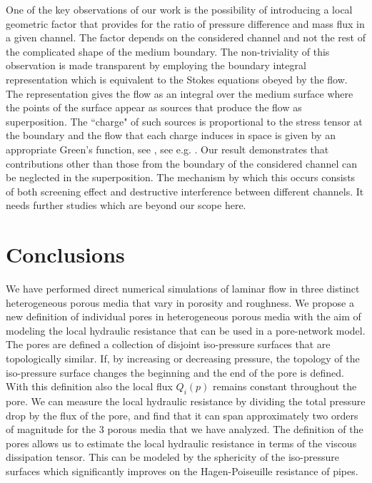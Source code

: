 \documentclass[draft]{agujournal2019}
\begin{document}
One of the key observations of our work is the possibility of introducing a local geometric factor that provides for the ratio of pressure difference and mass flux in a given channel. The factor depends on the considered channel and not the rest of the complicated shape of the medium boundary. The non-triviality of this observation is made transparent by employing the boundary integral representation which is equivalent to the Stokes equations obeyed by the flow. The representation gives the flow as an integral over the medium surface where the points of the surface appear as sources that produce the flow as superposition. The ``charge" of such sources is proportional to the stress tensor at the boundary and the flow that each charge induces in space is given by an appropriate Green's function, see , see e.g. \cite{pozrikidis_boundary_1992}. Our result demonstrates that contributions other than those from the boundary of the considered channel can be neglected in the superposition. The mechanism by which this occurs consists of both screening effect and destructive interference between different channels. It needs further studies which are beyond our scope here.



\section{Conclusions}
We have performed direct numerical simulations of laminar flow in three distinct heterogeneous porous media that vary in porosity and roughness. We propose a new definition of individual pores in heterogeneous porous media with the aim of modeling the local hydraulic resistance that can be used in a pore-network model. The pores are defined a collection of disjoint iso-pressure surfaces that are topologically similar. If, by increasing or decreasing pressure, the topology of the iso-pressure surface changes the beginning and the end of the pore is defined. With this definition also the local flux $Q_i(p)$ remains constant throughout the pore. We can measure the local hydraulic resistance by dividing the total pressure drop by the flux of the pore, and find that it can span approximately two orders of magnitude for the 3 porous media that we have analyzed. The definition of the pores allows us to estimate the local hydraulic resistance in terms of the viscous dissipation tensor. This can be modeled by the sphericity of the iso-pressure surfaces which significantly improves on the Hagen-Poiseuille resistance of pipes. 









\end{document}
